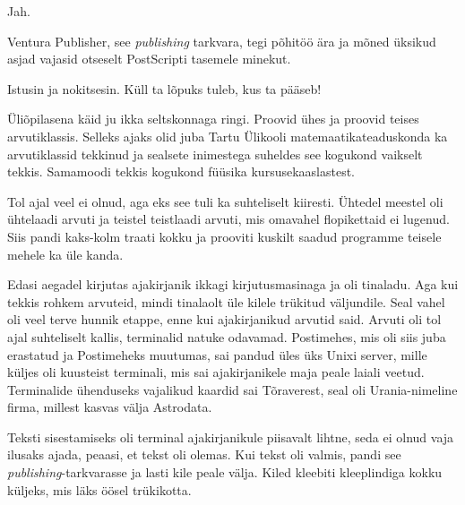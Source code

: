 
Jah.


Ventura Publisher, see \emph{publishing} tarkvara, tegi põhitöö ära ja mõned üksikud asjad vajasid otseselt 
PostScripti tasemele minekut. 


Istusin ja nokitsesin. Küll ta lõpuks tuleb, kus ta pääseb!


Üliõpilasena käid ju ikka seltskonnaga ringi. Proovid ühes ja
proovid teises arvutiklassis. Selleks ajaks olid juba Tartu Ülikooli 
matemaatikateaduskonda ka 
arvutiklassid tekkinud ja sealsete inimestega suheldes see kogukond vaikselt 
tekkis. Samamoodi tekkis kogukond füüsika 
kursusekaaslastest.


Tol ajal veel ei olnud, aga eks see tuli ka suhteliselt kiiresti. 
Ühtedel meestel oli ühtelaadi arvuti ja teistel teistlaadi arvuti, mis 
omavahel flopikettaid ei lugenud. Siis pandi kaks-kolm traati kokku ja 
prooviti kuskilt saadud programme teisele mehele ka üle kanda.


Edasi aegadel kirjutas ajakirjanik ikkagi kirjutusmasinaga ja oli 
tinaladu. Aga kui tekkis rohkem arvuteid, mindi tinalaolt üle kilele 
trükitud väljundile. Seal vahel oli veel terve hunnik etappe, enne kui ajakirjanikud 
arvutid said. Arvuti oli tol ajal suhteliselt kallis, terminalid 
natuke odavamad. Postimehes, mis oli siis juba erastatud ja 
Postimeheks muutumas, sai pandud üles üks Unixi server, mille küljes oli 
kuusteist terminali, mis sai ajakirjanikele maja peale laiali veetud. 
Terminalide ühenduseks vajalikud kaardid sai Tõraverest, seal oli 
Urania-nimeline firma, millest kasvas välja 
Astrodata.

Teksti sisestamiseks oli terminal ajakirjanikule piisavalt lihtne, seda ei 
olnud vaja ilusaks ajada, peaasi, et tekst oli olemas. Kui tekst oli valmis, 
pandi see \emph{publishing}-tarkvarasse ja lasti kile peale välja. Kiled 
kleebiti kleeplindiga kokku küljeks, mis läks öösel trükikotta. 

